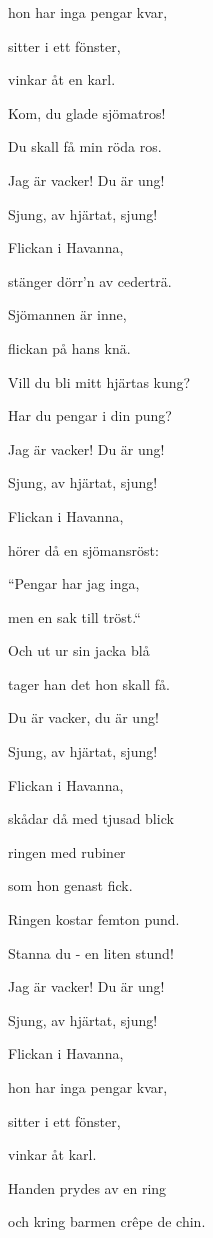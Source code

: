 hon har inga pengar kvar,

sitter i ett fönster,

vinkar åt en karl.

Kom, du glade sjömatros!

Du skall få min röda ros.

Jag är vacker! Du är ung!

Sjung, av hjärtat, sjung!\bigskip



Flickan i Havanna,

stänger dörr’n av cederträ.

Sjömannen är inne,

flickan på hans knä.

Vill du bli mitt hjärtas kung?

Har du pengar i din pung?

Jag är vacker! Du är ung!

Sjung, av hjärtat, sjung!\bigskip



Flickan i Havanna,

hörer då en sjömansröst:

“Pengar har jag inga,

men en sak till tröst.“

Och ut ur sin jacka blå

tager han det hon skall få.\bigskip



Du är vacker, du är ung!

Sjung, av hjärtat, sjung!\bigskip



Flickan i Havanna,

skådar då med tjusad blick

ringen med rubiner

som hon genast fick.

Ringen kostar femton pund.

Stanna du - en liten stund!

Jag är vacker! Du är ung!

Sjung, av hjärtat, sjung!\bigskip



Flickan i Havanna,

hon har inga pengar kvar,

sitter i ett fönster,

vinkar åt karl.

Handen prydes av en ring

och kring barmen crêpe de chin.


